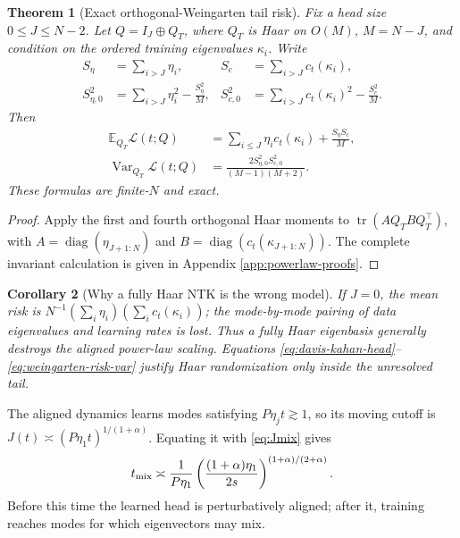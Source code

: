 \documentclass{article}
\newtheorem{theorem}{Theorem}[section]
\newtheorem{corollary}[theorem]{Corollary}
\newcommand{\E}{\mathbb E}
\newcommand{\Var}{\operatorname{Var}}
\newcommand{\tr}{\operatorname{tr}}
\newcommand{\diag}{\operatorname{diag}}
\begin{document}
\begin{theorem}[Exact orthogonal-Weingarten tail risk]
\label{thm:weingarten-risk}
Fix a head size \(0\le J\le N-2\).  Let \(Q=I_J\oplus Q_T\), where \(Q_T\) is Haar on \(O(M)\), \(M=N-J\), and condition on the ordered training eigenvalues \(\kappa_i\).  Write
\begin{align}
S_\eta&=\sum_{i>J}\eta_i,&
S_c&=\sum_{i>J}c_t(\kappa_i),\nonumber\\
S_{\eta,0}^2&=\sum_{i>J}\eta_i^2-\frac{S_\eta^2}{M},&
S_{c,0}^2&=\sum_{i>J}c_t(\kappa_i)^2-\frac{S_c^2}{M}.
\end{align}
Then
\begin{align}
\E_{Q_T}\mathcal L(t;Q)
&=\sum_{i\le J}\eta_i c_t(\kappa_i)+\frac{S_\eta S_c}{M},
\label{eq:weingarten-risk-mean}\\
\Var_{Q_T}\mathcal L(t;Q)
&=\frac{2S_{\eta,0}^2S_{c,0}^2}{(M-1)(M+2)}.
\label{eq:weingarten-risk-var}
\end{align}
These formulas are finite-\(N\) and exact.
\end{theorem}

\begin{proof}
Apply the first and fourth orthogonal Haar moments to
\(\tr(AQ_TBQ_T^\top)\), with
\(A=\diag(\eta_{J+1:N})\) and
\(B=\diag(c_t(\kappa_{J+1:N}))\).  The complete invariant calculation is given in Appendix \ref{app:powerlaw-proofs}.
\end{proof}

\begin{corollary}[Why a fully Haar NTK is the wrong model]
\label{cor:full-haar-wrong}
If \(J=0\), the mean risk is \(N^{-1}(\sum_i\eta_i)(\sum_i c_t(\kappa_i))\); the mode-by-mode pairing of data eigenvalues and learning rates is lost.  Thus a fully Haar eigenbasis generally destroys the aligned power-law scaling.  Equations \eqref{eq:davis-kahan-head}--\eqref{eq:weingarten-risk-var} justify Haar randomization only inside the unresolved tail.
\end{corollary}

The aligned dynamics learns modes satisfying \(P\eta_jt\gtrsim1\), so its moving cutoff is
\(J(t)\asymp(P\eta_1t)^{1/(1+\alpha)}\).  Equating it with \eqref{eq:Jmix} gives
\begin{equation}
t_{\rm mix}
\asymp\frac1{P\eta_1}
\left(\frac{(1+\alpha)\eta_1}{2s}\right)^{(1+\alpha)/(2+\alpha)}.
\label{eq:tmix}
\end{equation}
Before this time the learned head is perturbatively aligned; after it, training reaches modes for which eigenvectors may mix.
\end{document}

